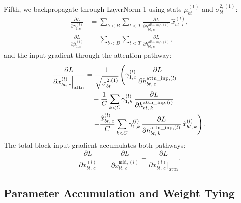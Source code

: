 \documentclass[letterpaper, 10 pt, conference]{ieeeconf}
\newcommand{\pdv}[2]{\frac{\partial #1}{\partial #2}}
\newcommand{\dL}[1]{\pdv{L}{#1}}
\theoremstyle{definition}
\begin{document}
Fifth, we backpropagate through LayerNorm 1 using stats $\mu^{(1)}_{bt}$ and $\sigma^{2, (1)}_{bt}$:
\begin{align}
  \dL{\gamma^{(l)}_{1, c}}
   & = \sum_{b<B} \sum_{t<T} \dL{h^{\text{attn\_inp}, (l)}_{bt,\, c}}\,\hat{x}^{(l)}_{bt,\, c},
  \label{eq:full-dgamma1}                                                                       \\
  \dL{\beta^{(l)}_{1, c}}
   & = \sum_{b<B} \sum_{t<T} \dL{h^{\text{attn\_inp}, (l)}_{bt,\, c}},
  \label{eq:full-dbeta1}
\end{align}
and the input gradient through the attention pathway:
\begin{align}
  \dL{x^{(l)}_{bt,\, c}\Big|_{\text{attn}}}
   & = \frac{1}{\sqrt{\sigma^{2, (1)}_{bt}}} \left( \gamma^{(l)}_{1, c}\,\dL{h^{\text{attn\_inp}, (l)}_{bt,\, c}} \right. \notag                                 \\
   & \quad - \frac{1}{C} \sum_{k<C} \gamma^{(l)}_{1, k}\,\dL{h^{\text{attn\_inp}, (l)}_{bt,\, k}} \notag                                                         \\
   & \quad \left. - \frac{\hat{x}^{(l)}_{bt,\, c}}{C} \sum_{k<C} \gamma^{(l)}_{1, k}\,\dL{h^{\text{attn\_inp}, (l)}_{bt,\, k}}\,\hat{x}^{(l)}_{bt,\, k} \right).
  \label{eq:full-dx-attn}
\end{align}
The total block input gradient accumulates both pathways:
\begin{equation}
  \dL{x^{(l)}_{bt,\, c}} \;=\; \dL{x^{\text{mid}, (l)}_{bt,\, c}} + \dL{x^{(l)}_{bt,\, c}\Big|_{\text{attn}}}.
  \label{eq:full-dx}
\end{equation}

\subsection{Parameter Accumulation and Weight Tying}
\end{document}
